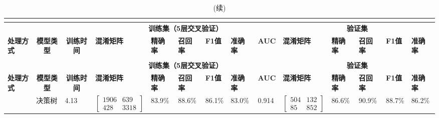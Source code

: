 \begin{landscape}
      \begin{longtable}{m{1.5cm}<{\centering}m{1.5cm}<{\centering}m{1.5cm}<{\centering}m{2cm}<{\centering}m{1cm}<{\centering}m{1cm}<{\centering}m{1cm}<{\centering}m{1cm}<{\centering}m{1cm}<{\centering}m{2cm}<{\centering}m{1cm}<{\centering}m{1cm}<{\centering}m{1cm}<{\centering}m{1cm}<{\centering}}
            \caption{基于脉搏波原始采样点的识别模型的初筛结果}\\
            \label{tab:model_screen3}\\
            \toprule
                  & \multicolumn{1}{c}{}   & \multicolumn{1}{c}{}  & \multicolumn{6}{c}{\textbf{训练集（5层交叉验证）}}   & \multicolumn{5}{c}{\textbf{验证集}}     \\
            \multirow{-2}{*}{\textbf{处理方式}}  & \multicolumn{1}{c}{\multirow{-2}{*}{\textbf{模型类型}}} & \multicolumn{1}{c}{\multirow{-2}{*}{\textbf{训练时间}}} & \textbf{混淆矩阵} & \textbf{精确率} & \textbf{召回率}& \textbf{F1值} & \textbf{准确率}& \textbf{AUC} & \textbf{混淆矩阵}& \textbf{精确率} & \textbf{召回率} & \textbf{F1值}& \textbf{准确率} \\
            \midrule
            \endfirsthead
            \caption[]{(续)}\\
            \midrule
                  & \multicolumn{1}{c}{}   & \multicolumn{1}{c}{}  & \multicolumn{6}{c}{\textbf{训练集（5层交叉验证）}}   & \multicolumn{5}{c}{\textbf{验证集}}                                                                                                                                                                                                    \\
            \multirow{-2}{*}{\textbf{处理方式}}  & \multicolumn{1}{c}{\multirow{-2}{*}{\textbf{模型类型}}} & \multicolumn{1}{c}{\multirow{-2}{*}{\textbf{训练时间}}} & \textbf{混淆矩阵} & \textbf{精确率} & \textbf{召回率}& \textbf{F1值} & \textbf{准确率}& \textbf{AUC} & \textbf{混淆矩阵}& \textbf{精确率} & \textbf{召回率} & \textbf{F1值}& \textbf{准确率} \\
            \midrule
            \endhead 
            \midrule
            \endfoot
            \bottomrule
            \endlastfoot
            & 决策树      & 4.13    & $\left[ \begin{array}{cc} 1906 & 639 \\ 428 & 3318 \end{array} \right]$ & 83.9\%  & 88.6\%  & 86.1\% & 83.0\% & 0.914    & $\left[ \begin{array}{cc} 504 & 132 \\ 85 & 852 \end{array} \right]$ & 86.6\%  & 90.9\%  & 88.7\% & 86.2\% \\

\end{longtable}
\end{landscape}
